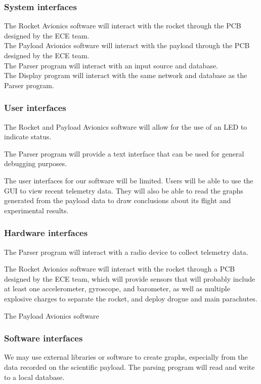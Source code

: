 \documentclass[onecolumn, draftclsnofoot, 10pt, compsoc]{IEEEtran}
\begin{document}
\subsubsection{System interfaces}
The Rocket Avionics software will interact with the rocket through the PCB designed by the ECE team.\\
The Payload Avionics software will interact with the payload through the PCB designed by the ECE team.\\
The Parser program will interact with an input source and database.\\
The Display program will interact with the same network and database as the Parser program.

\subsubsection{User interfaces}
The Rocket and Payload Avionics software will allow for the use of an LED to indicate status.

The Parser program will provide a text interface that can be used for general debugging purposes.

The user interfaces for our software will be limited. Users will be able to use the GUI to view recent telemetry data. They will also be able to read the graphs generated from the payload data to draw conclusions about its flight and experimental results.

\subsubsection{Hardware interfaces}
The Parser program will interact with a radio device to collect telemetry data.

The Rocket Avionics software will interact with the rocket through a PCB designed by the ECE team, which will provide sensors that will probably include at least one accelerometer, gyroscope, and barometer, as well as multiple explosive charges to separate the rocket, and deploy drogue and main parachutes.

The Payload Avionics software

\subsubsection{Software interfaces}
We may use external libraries or software to create graphs, especially from the data recorded on the scientific payload.  The parsing program will read and write to a local database.
\end{document}
